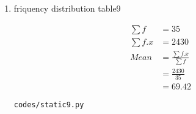 \renewcommand{\theequation}{\theenumi}
\begin{enumerate}[label=\arabic*.,ref=\thesubsection.\theenumi]
\item \begin{table}[!ht]
	\centering
	
	\caption{friquency distribution table9 }
\end{table}
\begin{align}
\sum{f} &= 35
\\
\sum{f.x} &= 2430
\\
Mean &= \frac{\sum{f.x}}{\sum{f}}
\\ &= \frac{2430}{35}
\\&= 69.42
\end{align}
\begin{lstlisting}
codes/static9.py
\end{lstlisting}
\end{enumerate}